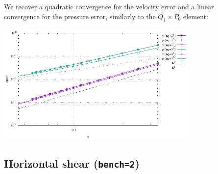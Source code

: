  
We recover a quadratic convergence for the velocity error and a linear convergence for the pressure error, 
similarly to the $Q_1\times P_0$ element:

\begin{center}
\includegraphics[width=10cm]{python_codes/fieldstone_81/results/bench1/conv.pdf}
\end{center}

\subsection*{Horizontal shear ({\tt bench=2})}


